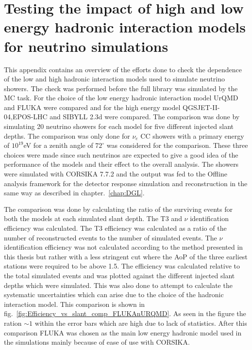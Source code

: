 \chapter{Testing the impact of high and low energy hadronic interaction models for neutrino simulations}
\label{sec:app_2}
This appendix contains an overview of the efforts done to check the dependence of the low and high hadronic interaction models used to simulate neutrino showers. The check was performed before the full library was simulated by the MC task. For the choice of the low energy hadronic interaction model UrQMD and FLUKA were compared and for the high energy model QGSJET-II-04,EPOS-LHC and SIBYLL 2.3d  were compared. The comparison was done by simulating 20 neutrino showers for each model for five different injected slant depths. The comparison was only done for $\nu_e$ CC showers with a primary energy of $10^{19}$eV for a zenith angle of $72^\circ$ was considered for the comparison. These three choices were made since such neutrinos are expected to give a good idea of the performance of the models and their effect to the overall analysis. The showers were simulated with CORSIKA 7.7.2 and the output was fed to the Offline analysis framework for the detector response simulation and reconstruction in the same way as described in chapter.~\ref{chap:DGL}. 

The comparison was done by calculating the ratio of the surviving events for both the models at each simulated slant depth. The T3 and $\nu$ identification efficiency was calculated. The T3 efficiency was calculated as a ratio of the number of reconstructed events to the number of simulated events. The $\nu$ identification efficiency was not calculated according to the method presented in this thesis but rather with a less stringent cut where the AoP of the three earliest stations were required to be above 1.5. The efficiency was calculated relative to the total simulated events and was plotted against the different injected slant depths which were simulated. This was also done to attempt to calculate the systematic uncertainties which can arise due to the choice of the hadronic interaction model. This comparison is shown in fig.~\ref{fig:Efficiency_vs_slant_comp_FLUKAnURQMD}. As seen in the figure the ration $\sim 1$ within the error bars which are high due to lack of statistics. After this comparison FLUKA was chosen as the main low energy hadronic model used in the simulations mainly because of ease of use with CORSIKA. 

